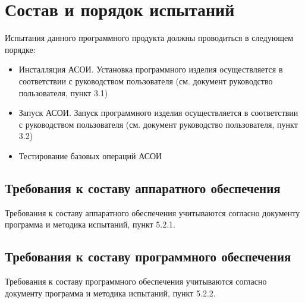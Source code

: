 \documentclass[russian,utf8,emptystyle]{eskdtext}
\begin{document}
\section{Состав и порядок испытаний}
Испытания данного программного продукта должны проводиться в следующем порядке:
\begin{itemize}
\item Инсталляция АСОИ. Установка программного изделия осуществляется в соответствии с руководством пользователя (см. документ руководство пользователя, пункт 3.1)
\item Запуск АСОИ. Запуск программного изделия осуществляется в соответствии с руководством пользователя (см. документ руководство пользователя, пункт 3.2)
\item Тестирование базовых операций АСОИ
\end{itemize}

\subsection{Требования к составу аппаратного обеспечения}
Требования к составу аппаратного обеспечения учитываются согласно документу программа и методика испытаний, пункт 5.2.1.

\subsection{Требования к составу программного обеспечения}
Требования к составу программного обеспечения учитываются согласно документу программа и методика испытаний, пункт 5.2.2.

\newpage
\end{document}
